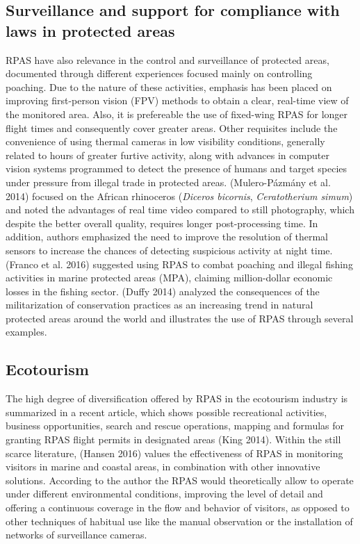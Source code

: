 \documentclass[]{interact}
\theoremstyle{plain}%
\theoremstyle{definition}
\theoremstyle{remark}
\begin{document}
\subsection{Surveillance and support for compliance with laws in
protected
areas}\label{surveillance-and-support-for-compliance-with-laws-in-protected-areas}

RPAS have also relevance in the control and surveillance of protected
areas, documented through different experiences focused mainly on
controlling poaching. Due to the nature of these activities, emphasis
has been placed on improving first-person vision (FPV) methods to obtain
a clear, real-time view of the monitored area. Also, it is prefereable
the use of fixed-wing RPAS for longer flight times and consequently
cover greater areas. Other requisites include the convenience of using
thermal cameras in low visibility conditions, generally related to hours
of greater furtive activity, along with advances in computer vision
systems programmed to detect the presence of humans and target species
under pressure from illegal trade in protected areas. (Mulero-Pázmány et
al. 2014) focused on the African rhinoceros (\emph{Diceros bicornis},
\emph{Ceratotherium simum}) and noted the advantages of real time video
compared to still photography, which despite the better overall quality,
requires longer post-processing time. In addition, authors emphasized
the need to improve the resolution of thermal sensors to increase the
chances of detecting suspicious activity at night time. (Franco et al.
2016) suggested using RPAS to combat poaching and illegal fishing
activities in marine protected areas (MPA), claiming million-dollar
economic losses in the fishing sector. (Duffy 2014) analyzed the
consequences of the militarization of conservation practices as an
increasing trend in natural protected areas around the world and
illustrates the use of RPAS through several examples.

\subsection{Ecotourism}\label{ecotourism}

The high degree of diversification offered by RPAS in the ecotourism
industry is summarized in a recent article, which shows possible
recreational activities, business opportunities, search and rescue
operations, mapping and formulas for granting RPAS flight permits in
designated areas (King 2014). Within the still scarce literature,
(Hansen 2016) values the effectiveness of RPAS in monitoring visitors in
marine and coastal areas, in combination with other innovative
solutions. According to the author the RPAS would theoretically allow to
operate under different environmental conditions, improving the level of
detail and offering a continuous coverage in the flow and behavior of
visitors, as opposed to other techniques of habitual use like the manual
observation or the installation of networks of surveillance cameras.
\end{document}
